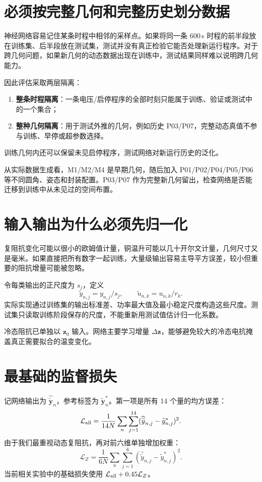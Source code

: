 \section{必须按完整几何和完整历史划分数据}
\label{sec:split}
神经网络容易记住某条时程中相邻的采样点。如果将同一条 600\,s 时程的前半段放在训练集、后半段放在测试集，测试并没有真正检验它能否处理新运行程序。对于跨几何问题，如果新几何的动态数据出现在训练中，测试结果同样难以说明跨几何能力。

因此评估采取两层隔离：
\begin{enumerate}
\item \textbf{整条时程隔离}：一条电压/启停程序的全部时刻只能属于训练、验证或测试中的一个集合；
\item \textbf{整种几何隔离}：用于测试外推的几何，例如历史 P03/P07，完整动态真值不参与训练、早停或超参数选择。
\end{enumerate}
训练几何内还可以保留未见启停程序，测试网络对新运行历史的泛化。

从实际数据生成看，M1/M2/M4 是早期几何，随后加入 P01/P02/P04/P05/P06 等不同圆角、姿态和封装配置。P03/P07 作为完整新几何留出，检查网络是否能迁移到训练中从未见过的空间布置。

\section{输入输出为什么必须先归一化}
复阻抗变化可能以很小的欧姆值计量，铜温升可能以几十开尔文计量，几何尺寸又是毫米。如果直接把所有数字一起训练，大量级输出容易主导平方误差，较小但重要的阻抗增量可能被忽略。

令每类输出的正尺度为 $s_j$，定义
\[
\widetilde y_{n,j}=y_{n,j}/s_j,\qquad
\widetilde u_{n,k}=u_{n,k}/r_k.
\]
实际实现通过训练集的输出标准差、功率最大值及最小稳定尺度构造这些尺度。测试集只读取训练阶段保存的尺度，不能重新用测试值估计归一化系数。

冷态阻抗已单独以 $\mathbf z_0$ 输入。网络主要学习增量 $\Delta\mathbf z$，能够避免较大的冷态电抗掩盖真正需要拟合的温变变化。

\section{最基础的监督损失}
记网络输出为 $\widehat{\widetilde{\mathbf y}}_n$，参考标签为 $\widetilde{\mathbf y}_n^*$。第一项是所有 14 个量的均方误差：
\begin{equation}
\mathcal L_{\rm all}
=\frac1{14N}\sum_n\sum_{j=1}^{14}
(\widehat{\widetilde y}_{n,j}-\widetilde y_{n,j}^{*})^2.
\end{equation}
由于我们最重视动态复阻抗，再对前六维单独增加权重：
\[
\mathcal L_{Z}
=\frac1{6N}\sum_n\sum_{j=1}^{6}
(\widehat{\widetilde y}_{n,j}-\widetilde y_{n,j}^{*})^2.
\]
当前相关实验中的基础损失使用 $\mathcal L_{\rm all}+0.45\mathcal L_Z$。

